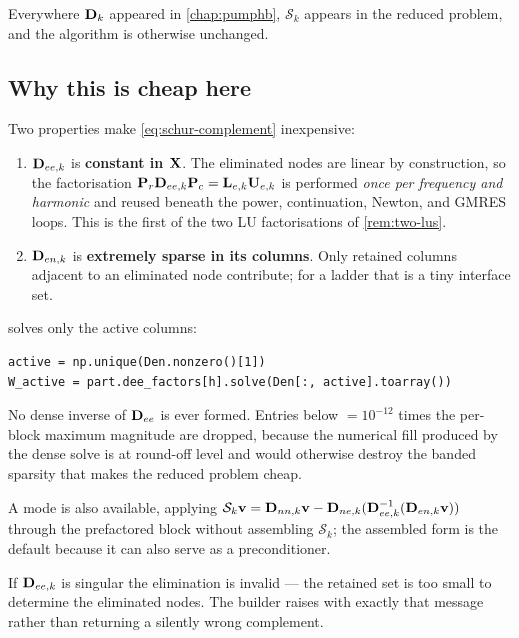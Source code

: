 Everywhere $\mathbf{D}_k$ appeared in \cref{chap:pumphb}, $\mathcal{S}_k$ appears in
the reduced problem, and the algorithm is otherwise unchanged.

\subsection{Why this is cheap here}

Two properties make \eqref{eq:schur-complement} inexpensive:

\begin{enumerate}
\item $\mathbf{D}_{ee,k}$ is \textbf{constant in $\mathbf{X}$}. The eliminated nodes are
      linear by construction, so the factorisation
      $\mathbf{P}_r\mathbf{D}_{ee,k}\mathbf{P}_c = \mathbf{L}_{e,k}\mathbf{U}_{e,k}$ is performed
      \emph{once per frequency and harmonic} and reused beneath the power,
      continuation, Newton, and GMRES loops. This is the first of the two LU
      factorisations of \cref{rem:two-lus}.
\item $\mathbf{D}_{en,k}$ is \textbf{extremely sparse in its columns}. Only retained
      columns adjacent to an eliminated node contribute; for a ladder that is a
      tiny interface set.
\end{enumerate}

\begin{implnote}
 solves only the active columns:
\begin{lstlisting}
active = np.unique(Den.nonzero()[1])
W_active = part.dee_factors[h].solve(Den[:, active].toarray())
\end{lstlisting}
No dense inverse of $\mathbf{D}_{ee}$ is ever formed. Entries below
 $=10^{-12}$ times the per-block maximum magnitude are dropped,
because the numerical fill produced by the dense solve is at round-off level and
would otherwise destroy the banded sparsity that makes the reduced problem cheap.

A  mode is also available, applying
$\mathcal{S}_k\mathbf{v} = \mathbf{D}_{nn,k}\mathbf{v} - \mathbf{D}_{ne,k}(\mathbf{D}_{ee,k}^{-1}
(\mathbf{D}_{en,k}\mathbf{v}))$ through the prefactored block without assembling
$\mathcal{S}_k$; the assembled form is the default because it can also serve as
a preconditioner.
\end{implnote}

\begin{caveat}
If $\mathbf{D}_{ee,k}$ is singular the elimination is invalid --- the retained set is
too small to determine the eliminated nodes. The builder raises with exactly
that message rather than returning a silently wrong complement.
\end{caveat}

